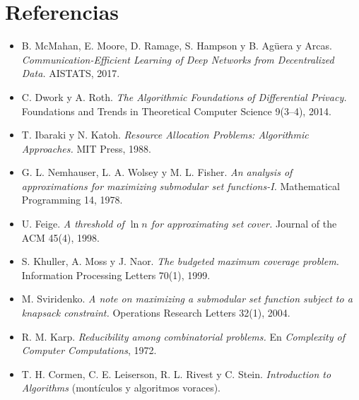 \documentclass[11pt,a4paper]{article}
\begin{document}
\newpage
\section{Referencias}

\begin{itemize}[leftmargin=*,label=$\bullet$]
  \item B. McMahan, E. Moore, D. Ramage, S. Hampson y B. Agüera y Arcas.
  \emph{Communication-Efficient Learning of Deep Networks from Decentralized
  Data.} AISTATS, 2017.
  \item C. Dwork y A. Roth. \emph{The Algorithmic Foundations of Differential
  Privacy.} Foundations and Trends in Theoretical Computer Science 9(3--4),
  2014.
  \item T. Ibaraki y N. Katoh. \emph{Resource Allocation Problems: Algorithmic
  Approaches.} MIT Press, 1988.
  \item G. L. Nemhauser, L. A. Wolsey y M. L. Fisher. \emph{An analysis of
  approximations for maximizing submodular set functions-I.} Mathematical
  Programming 14, 1978.
  \item U. Feige. \emph{A threshold of $\ln n$ for approximating set cover.}
  Journal of the ACM 45(4), 1998.
  \item S. Khuller, A. Moss y J. Naor. \emph{The budgeted maximum coverage
  problem.} Information Processing Letters 70(1), 1999.
  \item M. Sviridenko. \emph{A note on maximizing a submodular set function
  subject to a knapsack constraint.} Operations Research Letters 32(1), 2004.
  \item R. M. Karp. \emph{Reducibility among combinatorial problems.} En
  \emph{Complexity of Computer Computations}, 1972.
  \item T. H. Cormen, C. E. Leiserson, R. L. Rivest y C. Stein.
  \emph{Introduction to Algorithms} (montículos y algoritmos voraces).
\end{itemize}
\end{document}
